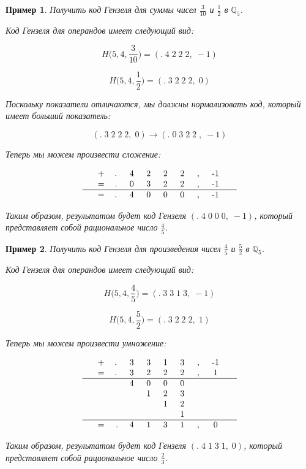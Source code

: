 \documentclass[master, och, diploma, times]{sty/SCWorks}
\theoremstyle{plain}
\newtheorem{exmp}{Пример}[section]
\theoremstyle{definition}
\numberwithin{equation}{section}
\begin{document}
\begin{exmp}
Получить код Гензеля для суммы чисел $\frac{3}{10}$ и $\frac{1}{2}$ в $\mathbb{Q}_5$.

\noindent Код Гензеля для операндов имеет следующий вид:

$$H\bigg(5,4, \frac{3}{10}\bigg)=(.\; 4\; 2\; 2\; 2,\; -1)$$

$$H\bigg(5,4, \frac{1}{2}\bigg)=(.\; 3\; 2\; 2\; 2,\; 0)$$


\noindent Поскольку показатели отличаются, мы должны нормализовать код, который имеет больший показатель:

$$
(.\; 3\; 2\; 2\; 2,\; 0) \rightarrow (.\; 0 \; 3\; 2\; 2\; ,\; -1)
$$

\noindent Теперь мы можем произвести сложение:

$$
\begin{tabular}{ccccccccccc}
& + & .\; & 4\; & 2\; & 2\; & 2\; & ,\; & -1\; &  \\
& = & .\; & 0\; & 3\; & 2\; & 2\; & ,\; & -1\; &  \\
\hline
& = & .\; & 4\; & 0\; & 0\; & 0\; & ,\; & -1\; &
\end{tabular}
$$


\noindent Таким образом, результатом будет код Гензеля $(.\; 4\; 0\; 0\; 0,\; -1)$, который представляет собой рациональное число $\frac{4}{5}$.
\end{exmp}

\begin{exmp}
Получить код Гензеля для произведения чисел $\frac{4}{5}$ и $\frac{5}{2}$ в $\mathbb{Q}_5$.

\noindent Код Гензеля для операндов имеет следующий вид:

$$H\bigg(5,4, \frac{4}{5}\bigg)=(.\; 3\; 3\; 1\; 3,\; -1)$$

$$H\bigg(5,4, \frac{5}{2}\bigg)=(.\; 3\; 2\; 2\; 2,\; 1)$$

\noindent Теперь мы можем произвести умножение:

$$
\begin{tabular}{cccccccccc}
& + & .\; & 3\; & 3\; & 1\; & 3\; & ,\; & -1\; \\
& = & .\; & 3\; & 2\; & 2\; & 2\; & ,\; & 1\; \\
\hline
& & & 4\; & 0\; & 0\; & 0\; & & & \\
& & & & 1\; & 2\; & 3\; & & & \\
& & & & & 1\; & 2\; & & & \\
& & & & & & 1\; & & & \\
\hline
& = & . & 4\; & 1\; & 3\; & 1\; & ,\; & 0\; &
\end{tabular}
$$


\noindent Таким образом, результатом будет код Гензеля $(.\; 4\; 1\; 3\; 1,\; 0)$, который представляет собой рациональное число $\frac{2}{3}$.
\end{exmp}
\end{document}
